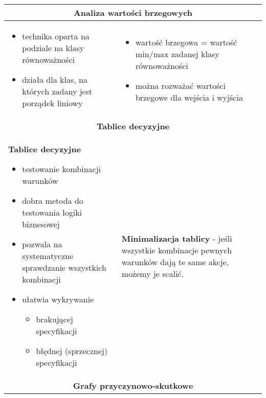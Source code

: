 \documentclass[../main.tex]{subfiles}
\begin{document}
    \begin{table}[H]
        \begin{center}
            \begin{tabular}{| p{8cm} p{8cm}|}
                \hline
                \multicolumn{2}{|c|}{ \textbf{Analiza wartości brzegowych}}\\
                \hline
                \begin{itemize}
                    \item technika oparta na podziale na klasy równoważności
                    \item działa dla klas, na których zadany jest porządek liniowy
                \end{itemize} &
                \begin{itemize}
                    \item wartość brzegowa = wartość min/max zadanej klasy równoważności
                    \item można rozważać wartości brzegowe dla wejścia i wyjścia
                \end{itemize}
                \\
                \hline
                \hline
                \multicolumn{2}{|c|}{ \textbf{Tablice decyzyjne}}\\
                \hline
                \textbf{Tablice decyzyjne}
                \begin{itemize}
                    \item testowanie kombinacji warunków
                    \item dobra metoda do testowania logiki biznesowej
                    \item pozwala na systematyczne sprawdzanie wszystkich kombinacji
                    \item ułatwia wykrywanie
                    \begin{itemize}
                        \item brakującej specyfikacji
                        \item błędnej (sprzecznej) specyfikacji
                    \end{itemize}
                \end{itemize}
                &
                \textbf{Minimalizacja tablicy} - jeśli wszystkie kombinacje pewnych warunków dają te same akcje, możemy je scalić.\\
                \hline
                \hline
                \multicolumn{2}{|c|}{ \textbf{Grafy przyczynowo-skutkowe}}\\

\end{tabular}
\end{center}
\end{table}
\end{document}
